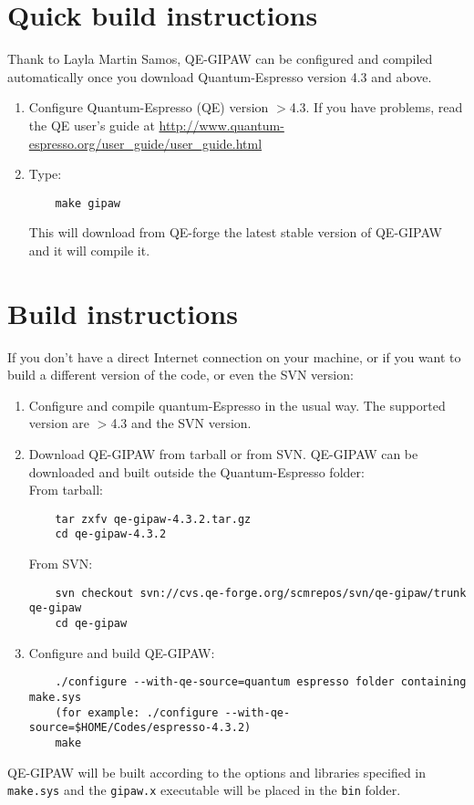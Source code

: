 \documentclass[a4paper,11pt,twoside]{article}
\begin{document}
\section{Quick build instructions}
Thank to Layla Martin Samos, QE-GIPAW can be configured and compiled automatically
once you download Quantum-Espresso version 4.3 and above.
\begin{enumerate}
\item Configure Quantum-Espresso (QE) version $>$4.3. If you have problems, read the
QE user's guide at \url{http://www.quantum-espresso.org/user_guide/user_guide.html}
\item Type:
\begin{verbatim}
    make gipaw
\end{verbatim}
This will download from QE-forge the latest stable version of QE-GIPAW
and it will compile it.
\end{enumerate}

\section{Build instructions}
If you don't have a direct Internet connection on your machine, or if you want
to build a different version of the code, or even the SVN version:
\begin{enumerate}
\item Configure and compile quantum-Espresso in the usual way. The
supported version are $>$4.3 and the SVN version.
\item Download QE-GIPAW from tarball or from SVN. QE-GIPAW can be
downloaded and built outside the Quantum-Espresso folder:\\
From tarball:
\begin{verbatim}
    tar zxfv qe-gipaw-4.3.2.tar.gz
    cd qe-gipaw-4.3.2
\end{verbatim}
From SVN:
\begin{verbatim}
    svn checkout svn://cvs.qe-forge.org/scmrepos/svn/qe-gipaw/trunk qe-gipaw
    cd qe-gipaw
\end{verbatim}
\item Configure and build QE-GIPAW:
\begin{verbatim}
    ./configure --with-qe-source=quantum espresso folder containing make.sys
    (for example: ./configure --with-qe-source=$HOME/Codes/espresso-4.3.2)
    make
\end{verbatim}
\end{enumerate}
QE-GIPAW will be built according to the options and libraries specified
in \texttt{make.sys} and the \texttt{gipaw.x} executable will be placed
in the \texttt{bin} folder.
\end{document}
